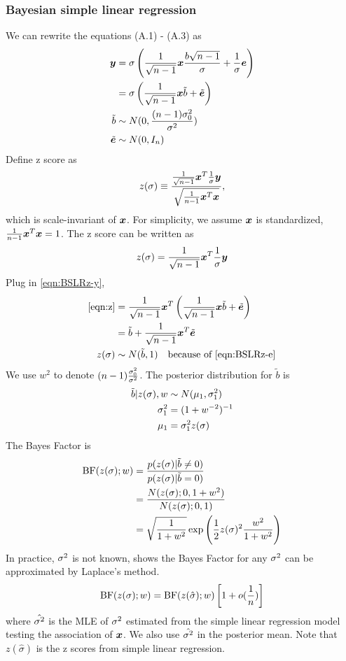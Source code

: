 \subsubsection{Bayesian simple linear regression}
We can rewrite the equations (A.1) - (A.3) as
\begin{align}
\bm y &= \sigma\left( \frac{1}{\sqrt{n-1}} \bm x \frac{b\sqrt{n-1}}{\sigma} + \frac { 1}{\sigma} \bm e \right) \\
 &= \sigma\left( \frac{1}{\sqrt{n-1}} \bm x \tilde{b} + \tilde{\bm e} \right) \label{eqn:BSLRz-y}\\
\tilde{b} &\sim N(0, \frac{(n-1) \sigma^2_{0}}{\sigma^2}) \\
\tilde{\bm e} & \sim N(0,I_n) \label{eqn:BSLRz-e}
\end{align}
Define z score as 
\begin{equation}
    z(\sigma) \equiv \frac{\frac{1}{\sqrt{n-1}}\bm x^T \frac{1}{\sigma}\bm y}{ \sqrt{\frac{1}{n-1}\bm x^T\bm x}},
\end{equation}
which is scale-invariant of $\bm x$. For simplicity, we assume $\bm x$ is standardized, $\frac{1}{n-1}\bm x^T\bm x = 1$. The z score can be written as
\begin{equation}\label{eqn:z}
    z(\sigma) = \frac{1}{\sqrt{n-1}}\bm x^T \frac{1}{\sigma}\bm y
\end{equation}
Plug in \eqref{eqn:BSLRz-y},
\begin{align}
    \eqref{eqn:z} &= \frac{1}{\sqrt{n-1}}\bm x^T \left( \frac{1}{\sqrt{n-1}} \bm x \tilde{b} + \tilde{\bm e} \right) \label{eqn:BSLRz-z}\\
    &= \tilde{b} + \frac{1}{\sqrt{n-1}}\bm x^T\tilde{\bm e} \\
    z(\sigma) &\sim N(\tilde{b}, 1) \quad \text{because of \eqref{eqn:BSLRz-e}} \label{eqn:BSLRz-zdistr}
\end{align}
We use $w^2$ to denote $(n-1)\frac{\sigma^2_0}{\sigma^2}$. The posterior distribution for $\tilde{b}$ is
\begin{align}
    \tilde{b} | z(\sigma), w &\sim N(\mu_1, \sigma^2_1) \\
    \sigma^2_1 &= (1 + w^{-2})^{-1} \\
    \mu_1 &= \sigma^2_1 z(\sigma)
\end{align}
The Bayes Factor is 
\begin{align}
    \text{BF}(z(\sigma); w) &=  \frac{p(z(\sigma) | \tilde{b} \neq 0)}{p(z(\sigma) | \tilde{b} = 0)}\label{eqn:BSLRz-BF} \\
    &= \frac{N(z(\sigma); 0, 1+w^2)}{N(z(\sigma); 0, 1)} \\
    &= \sqrt{\frac{1}{1+w^2}} \exp\left( \frac{1}{2} z(\sigma)^2 \frac{w^2}{1+w^2} \right)
\end{align}
In practice, $\sigma^2$ is not known, \cite{wen2014bayesian} shows the Bayes Factor for any $\sigma^2$ can be approximated by Laplace's method.
\begin{equation}
    \text{BF}(z(\sigma); w) =  \text{BF}(z(\hat{\sigma}); w) \left[1+o(\frac{1}{n})\right]
\end{equation}
where $\hat{\sigma^2}$ is the MLE of $\sigma^2$ estimated from the simple linear regression model testing the association of $\bm x$. We also use $\hat{\sigma^2}$ in the posterior mean. Note that $z(\hat{\sigma})$ is the z scores from simple linear regression.

